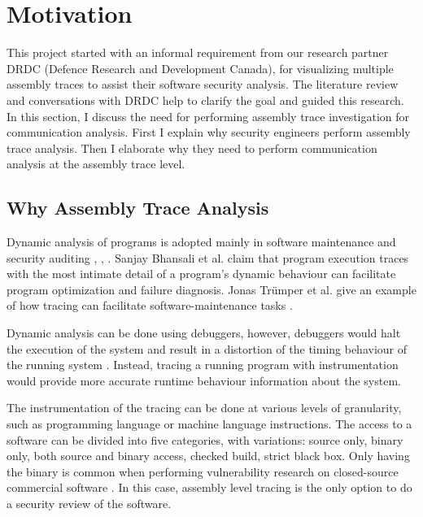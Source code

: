 \section{Motivation}
This project started with an informal requirement from our research partner DRDC (Defence Research and Development Canada), for visualizing multiple assembly traces to assist their software security analysis. The literature review and conversations with DRDC help to clarify the goal and guided this research. In this section, I discuss the need for performing assembly trace investigation for communication analysis. First I explain why security engineers perform assembly trace analysis. Then I elaborate why they need to perform communication analysis at the assembly trace level. 

\subsection{Why Assembly Trace Analysis}
Dynamic analysis of programs is adopted mainly in software maintenance and security auditing \cite{zhang2010detecting}, \cite{cai2016sworddta}, \cite{somorovsky2016systematic}. Sanjay Bhansali et al. claim that program execution traces with the most intimate detail of a program's dynamic behaviour can facilitate program optimization and failure diagnosis. Jonas Tr{\"u}mper et al. give an example of how tracing can facilitate software-maintenance tasks \cite{trumper2012maintenance}.

Dynamic analysis can be done using debuggers, however, debuggers would halt the execution of the system and result in a distortion of the timing behaviour of the running system \cite{trumper2012maintenance}. Instead, tracing a running program with instrumentation would provide more accurate runtime behaviour information about the system. 

The instrumentation of the tracing can be done at various levels of granularity, such as programming language or machine language instructions. The access to a software can be divided into five categories, with variations: source only, binary only, both source and binary access, checked build, strict black box. Only having the binary is common when performing vulnerability research on closed-source commercial software \cite{dowd_art_2006}. In this case, assembly level tracing is the only option to do a security review of the software.

